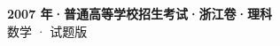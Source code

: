 \documentclass[zihao=-4, a4paper]{ctexart}
\begin{document}
\begin{center}
  {\Large\bfseries 2007 年·普通高等学校招生考试·浙江卷·理科}\\[4pt]
  {\large 数学 · 试题版}
\end{center}
\medskip
{}

\end{document}
